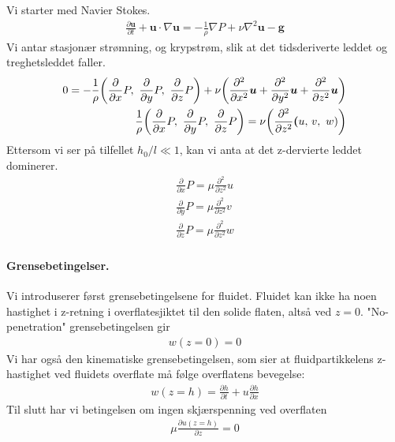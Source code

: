 \documentclass[12p,a4paper]{article}
\renewcommand{\b}{\boldsymbol}
\begin{document}
\subsubsection{}
Vi starter med Navier Stokes.
\begin{align*}
    \frac{\partial\b u}{\partial t} + \b u \cdot \nabla \b u = -\frac{1}{\rho}\nabla P + \nu \nabla^2\b u - \b g
\end{align*}
Vi antar stasjonær strømning, og krypstrøm, slik at det tidsderiverte leddet og treghetsleddet faller.
\begin{align*}
    0 = -\frac{1}{\rho} \qty(\frac{\partial}{\partial x}P,\ \frac{\partial}{\partial y}P,\ \frac{\partial}{\partial z}P) + \nu \qty(\frac{\partial^2}{\partial x^2}\b u + \frac{\partial^2}{\partial y^2}\b u + \frac{\partial^2}{\partial z^2}\b u) \\
    \frac{1}{\rho} \qty(\frac{\partial}{\partial x}P,\ \frac{\partial}{\partial y}P,\ \frac{\partial}{\partial z}P) = \nu \qty(\frac{\partial^2}{\partial z^2}\b (u,\, v,\ w))
\end{align*}
Ettersom vi ser på tilfellet $h_0/l \ll 1$, kan vi anta at det z-dervierte leddet dominerer.
\begin{align*}
    \frac{\partial}{\partial x}P = \mu \frac{\partial^2}{\partial z^2} u \\
    \frac{\partial}{\partial y}P = \mu \frac{\partial^2}{\partial z^2} v \\
    \frac{\partial}{\partial z}P = \mu \frac{\partial^2}{\partial z^2} w
\end{align*}



\subsubsection{}
\paragraph{Grensebetingelser.}
Vi introduserer først grensebetingelsene for fluidet.
Fluidet kan ikke ha noen hastighet i z-retning i overflatesjiktet til den solide flaten, altså ved $z=0$. "No-penetration" grensebetingelsen gir
\begin{align}\label{GB:no_pen}
    w(z=0) = 0
\end{align}
Vi har også den kinematiske grensebetingelsen, som sier at fluidpartikkelens z-hastighet ved fluidets overflate må følge overflatens bevegelse:
\begin{align}\label{GB:kin}
    w(z=h) = \frac{\partial h}{\partial t} + u \frac{\partial h}{\partial x}
\end{align}
Til slutt har vi betingelsen om ingen skjærspenning ved overflaten
\begin{align}\label{GB:sheer_stress}
    \mu\frac{\partial u(z=h)}{\partial z} = 0
\end{align}
\end{document}
